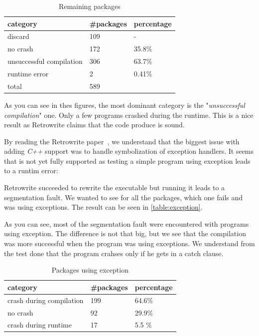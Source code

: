 \documentclass[a4paper,11pt,oneside]{report}
\newcommand{\sysname}{Retrowrite\xspace}
\begin{document}
\begin{table}[H]
    \centering
    \begin{tabular}{lll}
        \hline
        category                & \#packages & percentage \\
        \hline
        discard                  & 109 & -  \\
        no crash                 & 172 & 35.8\% \\
        unsuccessful compilation & 306 & 63.7\% \\
        runtime error            & 2   & 0.41\% \\
        \hline
        total                    & 589  \\
        \hline
    \end{tabular}
    \caption{Remaining packages}
    \label{table:remaining}
\end{table}

As you can see in thes figures, the most dominant category is the
"\textit{unsuccessful compilation}" one. Only a few programs crashed during the
runtime. This is a nice result as \sysname claims that the code produce is
sound.

By reading the \sysname paper~\cite{dinesh20oakland}, we understand that
the biggest issue with adding \textit{C++} support was to handle symbolization
of exception handlers. It seems that is not yet fully supported as testing a
simple program using exception leads to a runtim error:



Retrowrite succeeded to rewrite the executable but running it leads to a segmentation fault.
We wanted to see for all the packages, which one fails and was using
exceptions. The result can be seen in \autoref{table:exception}.

As you can see, most of the segmentation fault were encountered with programs
using exception. The difference is not that big, but we see that the compilation
was more successful when the program was using exceptions. We understand from
the test done that the program crahses only if he gets in a catch clause.

\begin{table}[H]
    \centering
    \begin{tabular}{lll} 
        \hline
        category                & \#packages & percentage \\ 
        \hline
        crash during compilation & 199 & 64.6\%      \\
        no crash                 & 92  & 29.9\%       \\
        crash during runtime     & 17  & 5.5 \%       \\
        \hline
    \end{tabular}
    \caption{Packages using exception}
    \label{table:exception}
\end{table}
\end{document}
